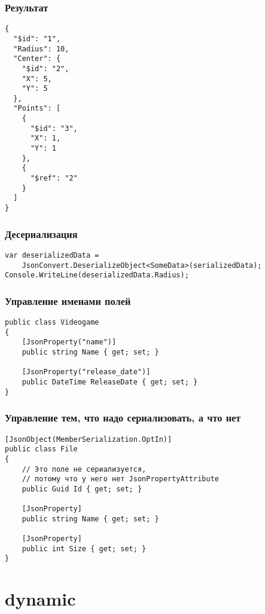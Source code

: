 \documentclass{../../slides-style}
\begin{document}
    \begin{frame}[fragile]
        \frametitle{Результат}
        \begin{footnotesize}
            \begin{verbatim}
{
  "$id": "1",
  "Radius": 10,
  "Center": {
    "$id": "2",
    "X": 5,
    "Y": 5
  },
  "Points": [
    {
      "$id": "3",
      "X": 1,
      "Y": 1
    },
    {
      "$ref": "2"
    }
  ]
}
            \end{verbatim}
        \end{footnotesize}
    \end{frame}

    \begin{frame}[fragile]
        \frametitle{Десериализация}
        \begin{verbatim}
var deserializedData = 
    JsonConvert.DeserializeObject<SomeData>(serializedData);
Console.WriteLine(deserializedData.Radius);
        \end{verbatim}
    \end{frame}

    \begin{frame}[fragile]
        \frametitle{Управление именами полей}
        \begin{verbatim}
public class Videogame
{
    [JsonProperty("name")]
    public string Name { get; set; }

    [JsonProperty("release_date")]
    public DateTime ReleaseDate { get; set; }
}
        \end{verbatim}
    \end{frame}

    \begin{frame}[fragile]
        \frametitle{Управление тем, что надо сериализовать, а что нет}
        \begin{verbatim}
[JsonObject(MemberSerialization.OptIn)]
public class File
{
    // Это поле не сериализуется,
    // потому что у него нет JsonPropertyAttribute
    public Guid Id { get; set; }

    [JsonProperty]
    public string Name { get; set; }

    [JsonProperty]
    public int Size { get; set; }
}
        \end{verbatim}
    \end{frame}

    \section{dynamic}
\end{document}
